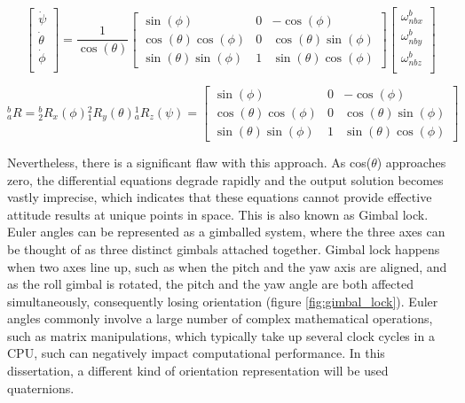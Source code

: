 \begin{equation}
    \begin{bmatrix}
        \dot{\psi}   \\
        \dot{\theta} \\
        \dot{\phi}   \\
    \end{bmatrix}
    =
    \frac{1}{\cos(\theta)}
    \begin{bmatrix}
        \sin(\phi)             & 0 & -\cos(\phi)            \\
        \cos(\theta)\cos(\phi) & 0 & \cos(\theta)\sin(\phi) \\
        \sin(\theta)\sin(\phi) & 1 & \sin(\theta)\cos(\phi)
    \end{bmatrix}
    \begin{bmatrix}
        \omega{^b_{nbx}} \\
        \omega{^b_{nby}} \\
        \omega{^b_{nbz}} \\
    \end{bmatrix}
    \label{eq:euler_equation}
\end{equation}

\begin{equation}
    {^b_a}R = {^b_2}R_x(\phi){^2_1}R_y(\theta){^1_a}R_z(\psi)
    =
    \begin{bmatrix}
        \sin(\phi)             & 0 & -\cos(\phi)            \\
        \cos(\theta)\cos(\phi) & 0 & \cos(\theta)\sin(\phi) \\
        \sin(\theta)\sin(\phi) & 1 & \sin(\theta)\cos(\phi)
    \end{bmatrix}
    \label{eq:euler_equations}
\end{equation}

Nevertheless, there is a significant flaw with this approach. As cos($\theta$) approaches zero, the differential equations degrade rapidly and the output solution becomes vastly imprecise, which indicates that these equations cannot provide effective attitude results at unique points in space. This is also known as Gimbal lock. Euler angles can be represented as a gimballed system, where the three axes can be thought of as three distinct gimbals attached together. Gimbal lock happens when two axes line up, such as when the pitch and the yaw axis are aligned, and as the roll gimbal is rotated, the pitch and the yaw angle are both affected simultaneously, consequently losing orientation (figure \ref{fig:gimbal_lock}).
Euler angles commonly involve a large number of complex mathematical operations, such as matrix manipulations, which typically take up several clock cycles in a CPU, such can negatively impact computational performance. In this dissertation, a different kind of orientation representation will be used quaternions.


